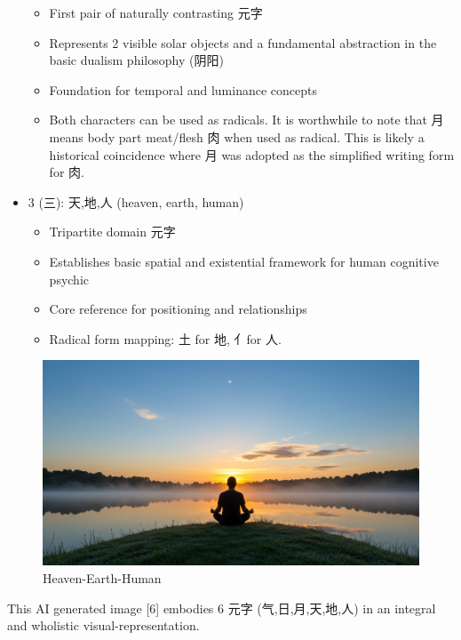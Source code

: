 \begin{itemize}
  \begin{itemize}
  \tightlist
  \item
    First pair of naturally contrasting 元字
  \item
    Represents 2 visible solar objects and a fundamental abstraction in
    the basic dualism philosophy (阴阳)
  \item
    Foundation for temporal and luminance concepts
  \item
    Both characters can be used as radicals. It is worthwhile to note
    that 月 means body part meat/flesh 肉 when used as radical. This is
    likely a historical coincidence where 月 was adopted as the
    simplified writing form for 肉.
  \end{itemize}
\item
  3 (三): 天,地,人 (heaven, earth, human)

  \begin{itemize}
  \tightlist
  \item
    Tripartite domain 元字
  \item
    Establishes basic spatial and existential framework for human
    cognitive psychic
  \item
    Core reference for positioning and relationships
  \item
    Radical form mapping: 土 for 地, 亻for 人.
  \end{itemize}
\end{itemize}

\begin{figure}
\centering
\includegraphics{./images/sun-moon-heaven-human-earth-meditation-morning.jpg}
\caption{Heaven-Earth-Human}
\end{figure}

This AI generated image {[}6{]} embodies 6 元字 (气,日,月,天,地,人) in
an integral and wholistic visual-representation.

